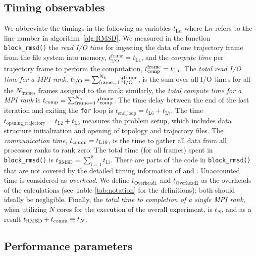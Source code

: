 \subsection{Timing observables}

We abbreviate the timings in the following as variables $t_{\text{L$n$}}$ where $\text{L$n$}$ refers to the line number in algorithm~\ref{alg:RMSD}.
We measured in the function \texttt{block\_rmsd()} the \emph{read I/O time} for ingesting the data of one trajectory frame from the file system into memory, $t_{\text{I/O}}^{\text{frame}} = t_{\text{L4}}$, and the \emph{compute time} per trajectory frame to perform the computation, ${t}_{\text{comp}}^{\text{frame}} = t_{\text{L5}}$.
The \emph{total read I/O time for a MPI rank},  ${t}_{\text{I/O}} = \sum_{\text{frame}=1}^{N_{\text{b}}} {t}_{\text{I/O}}^{\text{frame}}$, is the sum over all I/O times for all the $N_{\text{frames}}$ frames assigned to the rank; similarly, the \emph{total compute time for a MPI rank} is ${t}_{\text{comp}} = \sum_{\text{frame}=1}^{N_{\text{b}}} {t}_{\text{comp}}^{\text{frame}}$. 
The time delay between the end of the last iteration and exiting the \texttt{for} loop is $t_{\text{end\_loop}} = t_{\text{L6}}+t_{\text{L7}}$.
The time $t_{\text{opening\_trajectory}} = t_{\text{L2}}+t_{\text{L3}}$ measures the problem setup, which includes data structure initialization and opening of topology and trajectory files.
The \emph{communication time}, $t_{\text{comm}} = t_{\text{L16}}$, is the time to gather all data from all processor ranks to rank zero.
The total time (for all frames) spent in \texttt{block\_rmsd()} is $t_{\text{RMSD}} = \sum_{i=1}^{8}t_{\text{L$i$}}$. 
There are parts of the code in \texttt{block\_rmsd()} that are not covered by the detailed timing information of \tcomp and \tIO.
Unaccounted time is considered as \emph{overhead}.
We define $t_{\text{Overhead1}}$ and $t_{\text{Overhead2}}$ as the overheads of the calculations (see Table \ref{tab:notation} for the definitions); both should ideally be negligible. 
Finally, the \emph{total time to completion of a single MPI rank}, when utilizing $N$ cores for the execution of the overall experiment, is $t_{N}$, and as a result $t_{\text{RMSD}} + t_{\text{comm}} \equiv t_{N}$.

\subsection{Performance parameters}

